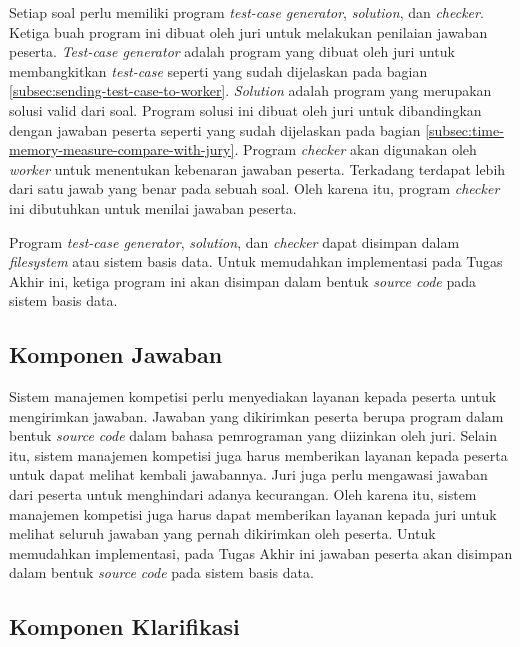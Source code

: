 \par Setiap soal perlu memiliki program \textit{test-case generator}, \textit{solution}, dan \textit{checker}. Ketiga buah program ini dibuat oleh juri untuk melakukan penilaian jawaban peserta. \textit{Test-case generator} adalah program yang dibuat oleh juri untuk membangkitkan \textit{test-case} seperti yang sudah dijelaskan pada bagian \ref{subsec:sending-test-case-to-worker}. \textit{Solution} adalah program yang merupakan solusi valid dari soal. Program solusi ini dibuat oleh juri untuk dibandingkan dengan jawaban peserta seperti yang sudah dijelaskan pada bagian \ref{subsec:time-memory-measure-compare-with-jury}. Program \textit{checker} akan digunakan oleh \textit{worker} untuk menentukan kebenaran jawaban peserta. Terkadang terdapat lebih dari satu jawab yang benar pada sebuah soal. Oleh karena itu, program \textit{checker} ini dibutuhkan untuk menilai jawaban peserta. 

\par Program \textit{test-case generator}, \textit{solution}, dan \textit{checker} dapat disimpan dalam \textit{filesystem} atau sistem basis data. Untuk memudahkan implementasi pada Tugas Akhir ini, ketiga program ini akan disimpan dalam bentuk \textit{source code} pada sistem basis data.

\subsection{Komponen Jawaban}

\par Sistem manajemen kompetisi perlu menyediakan layanan kepada peserta untuk mengirimkan jawaban. Jawaban yang dikirimkan peserta berupa program dalam bentuk \textit{source code} dalam bahasa pemrograman yang diizinkan oleh juri. Selain itu, sistem manajemen kompetisi juga harus memberikan layanan kepada peserta untuk dapat melihat kembali jawabannya. Juri juga perlu mengawasi jawaban dari peserta untuk menghindari adanya kecurangan.  Oleh karena itu, sistem manajemen kompetisi juga harus dapat memberikan layanan kepada juri untuk melihat seluruh jawaban yang pernah dikirimkan oleh peserta. Untuk memudahkan implementasi, pada Tugas Akhir ini jawaban peserta akan disimpan dalam bentuk \textit{source code} pada sistem basis data.

\subsection{Komponen Klarifikasi}

